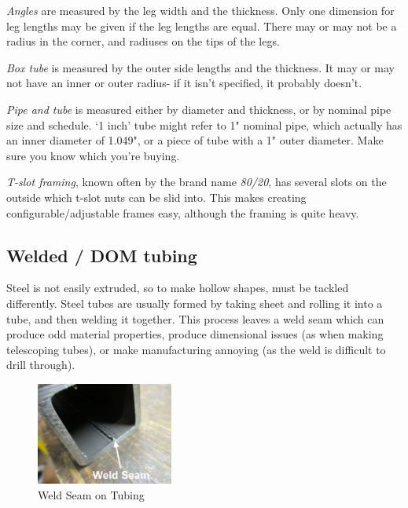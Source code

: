 \documentclass[10pt,letterpaper]{book}
\begin{document}
 \begin{asparaenum}[a)]
 	\item \textit{Angles} are measured by the leg width and the thickness. Only one dimension for leg lengths may be given if the leg lengths are equal. There may or may not be a radius in the corner, and radiuses on the tips of the legs.
 	\item \textit{Box tube} is measured by the outer side lengths and the thickness. It may or may not have an inner or outer radius- if it isn't specified, it probably doesn't.
 	\item \textit{Pipe and tube} is measured either by diameter and thickness, or by nominal pipe size and schedule. `1 inch' tube might refer to 1" nominal pipe, which actually has an inner diameter of 1.049", or a piece of tube with a 1" outer diameter. Make sure you know which you're buying.
 	\item \textit{T-slot framing}, known often by the brand name \textit{80/20}, has several slots on the outside which t-slot nuts can be slid into. This makes creating configurable/adjustable frames easy, although the framing is quite heavy. 
 \end{asparaenum}
 
 \subsection{Welded / DOM tubing}
 Steel is not easily extruded, so to make hollow shapes, must be tackled differently. Steel tubes are usually formed by taking sheet and rolling it into a tube, and then welding it together. This process leaves a weld seam which can produce odd material properties, produce dimensional issues (as when making telescoping tubes), or make manufacturing annoying (as the weld is difficult to drill through). 
 
   \begin{figure}[H]
	\centering
	\includegraphics[width=0.4\textwidth]{imgs/welded_tube_seam.png}
	
	\caption{Weld Seam on Tubing}
\end{figure}
 
\end{document}
